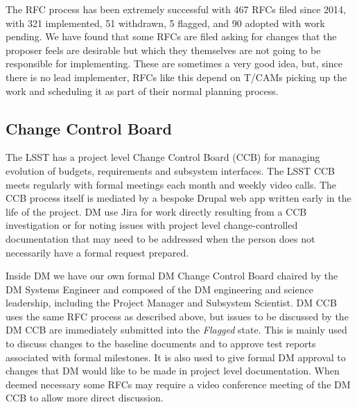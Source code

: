 The RFC process has been extremely successful with 467 RFCs filed since 2014, with 321 implemented, 51 withdrawn, 5 flagged, and 90 adopted with work pending.
We have found that some RFCs are filed asking for changes that the proposer feels are desirable but which they themselves are not going to be responsible for implementing.
These are sometimes a very good idea, but, since there is no lead implementer, RFCs like this depend on T/CAMs picking up the work and scheduling it as part of their normal planning process.

\subsection{Change Control Board}
\label{sec:ccb}

The LSST has a project level Change Control Board (CCB) for managing evolution of budgets, requirements and subsystem interfaces.
The LSST CCB meets regularly with formal meetings each month and weekly video calls.
The CCB process itself is mediated by a bespoke Drupal web app written early in the life of the project.
DM  use Jira for work directly resulting from a CCB investigation or for noting issues with project level change-controlled documentation that may need to be addressed when the person does not necessarily have a formal request prepared.

Inside DM we have our own formal DM Change Control Board
chaired by the DM Systems Engineer and composed of the DM engineering and science leadership, including the Project Manager and Subsystem Scientist.
DM CCB uses the same RFC process as described above, but issues to be discussed by the DM CCB are immediately submitted into the \emph{Flagged} state.
This is mainly used to discuss changes to the baseline documents and to approve test reports associated with formal milestones.
It is also used to give formal DM approval to changes that DM would like to be made in project level documentation.
When deemed necessary some RFCs may require a video conference meeting of the DM CCB to allow more direct discussion.
